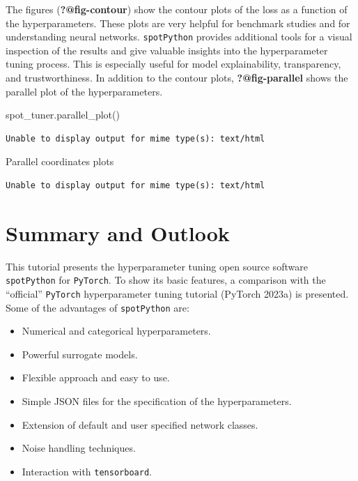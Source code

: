 \documentclass[
  letterpaper,
  DIV=11,
  numbers=noendperiod]{scrreprt}
\newenvironment{Shaded}{\begin{snugshade}}{\end{snugshade}}
\newcommand{\NormalTok}[1]{\textcolor[rgb]{0.00,0.23,0.31}{#1}}
\providecommand{\tightlist}{%
  \setlength{\itemsep}{0pt}\setlength{\parskip}{0pt}}\usepackage{longtable,booktabs,array}
\begin{document}
The figures (\textbf{?@fig-contour}) show the contour plots of the loss
as a function of the hyperparameters. These plots are very helpful for
benchmark studies and for understanding neural networks.
\texttt{spotPython} provides additional tools for a visual inspection of
the results and give valuable insights into the hyperparameter tuning
process. This is especially useful for model explainability,
transparency, and trustworthiness. In addition to the contour plots,
\textbf{?@fig-parallel} shows the parallel plot of the hyperparameters.

\begin{Shaded}
\begin{Highlighting}[]
\NormalTok{spot\_tuner.parallel\_plot()}
\end{Highlighting}
\end{Shaded}

\begin{verbatim}
Unable to display output for mime type(s): text/html
\end{verbatim}

Parallel coordinates plots

\begin{verbatim}
Unable to display output for mime type(s): text/html
\end{verbatim}

\hypertarget{sec-summary}{%
\section{Summary and Outlook}\label{sec-summary}}

This tutorial presents the hyperparameter tuning open source software
\texttt{spotPython} for \texttt{PyTorch}. To show its basic features, a
comparison with the ``official'' \texttt{PyTorch} hyperparameter tuning
tutorial (PyTorch 2023a) is presented. Some of the advantages of
\texttt{spotPython} are:

\begin{itemize}
\tightlist
\item
  Numerical and categorical hyperparameters.
\item
  Powerful surrogate models.
\item
  Flexible approach and easy to use.
\item
  Simple JSON files for the specification of the hyperparameters.
\item
  Extension of default and user specified network classes.
\item
  Noise handling techniques.
\item
  Interaction with \texttt{tensorboard}.
\end{itemize}
\end{document}
